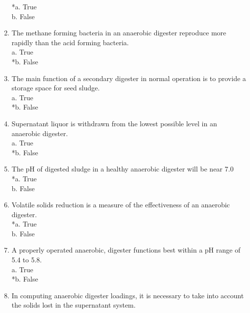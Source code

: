 \begin{enumerate}
*a. True \\
b. False \\

\item  The methane forming bacteria in an anaerobic digester reproduce more rapidly than the acid forming bacteria. \\

a. True \\
*b. False \\

\item  The main function of a secondary digester in normal operation is to provide a storage space for seed sludge. \\

a. True \\
*b. False \\

\item  Supernatant liquor is withdrawn from the lowest possible level in an anaerobic digester. \\

a. True \\
*b. False \\

\item  The pH of digested sludge in a healthy anaerobic digester will be near 7.0 \\

*a. True \\
b. False \\

\item  Volatile solids reduction is a measure of the effectiveness of an anaerobic digester. \\

*a. True \\
b. False \\

\item  A properly operated anaerobic, digester functions best within a pH range of 5.4 to 5.8. \\

a. True \\
*b. False \\

\item  In computing anaerobic digester loadings, it is necessary to take into account the solids lost in the supernatant system. \\


\end{enumerate}
